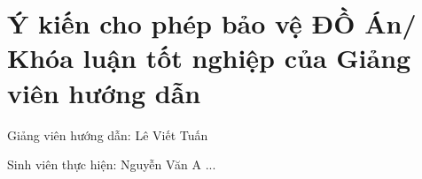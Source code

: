 \chapter*{Ý kiến cho phép bảo vệ ĐỒ Án/ Khóa luận tốt nghiệp của Giảng viên hướng dẫn}
\label{adviser}

Giảng viên hướng dẫn: Lê Viết Tuấn

Sinh viên thực hiện: Nguyễn Văn A
...